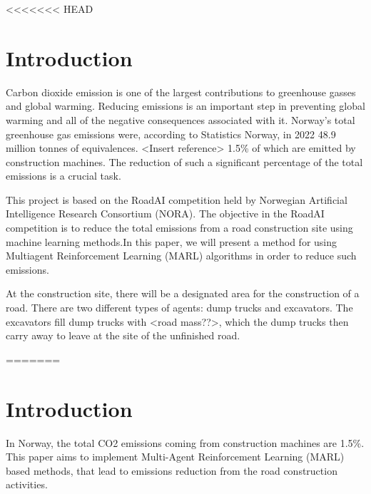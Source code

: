 \documentclass[conference]{IEEEtran}
\begin{document}


<<<<<<< HEAD
\section{Introduction}
Carbon dioxide \coo emission is one of the largest contributions to greenhouse gasses and global warming.
Reducing \coo emissions is an important step in preventing global warming and all of the negative
consequences associated with it. Norway's total greenhouse gas emissions were, according to Statistics
Norway, in 2022 48.9 million tonnes of \coo equivalences. <Insert reference> 1.5\% of which are emitted
by construction machines. \cite{noraRoadAIReducing} The reduction of such a significant percentage of
the total emissions is a crucial task.

This project is based on the RoadAI competition held by Norwegian Artificial Intelligence Research
Consortium (NORA). \cite{noraRoadAIReducing} The objective in the RoadAI competition is to reduce the
total \coo emissions from a road construction site using machine learning methods.In this paper, we will
present a method for using Multiagent Reinforcement Learning (MARL) algorithms in order to reduce such
emissions.

At the construction site, there will be a designated area for the construction of a road. There are two
different types of agents: dump trucks and excavators. The excavators fill dump trucks with <road mass??>,
which the dump trucks then carry away to leave at the site of the unfinished road.


=======
	\section{Introduction}
	In Norway, the total CO2 emissions coming from construction machines are 1.5\%.\cite{noraRoadAIReducing}
	This paper aims to implement Multi-Agent Reinforcement Learning (MARL) based methods, that lead to emissions reduction from the road construction activities.
\end{document}
